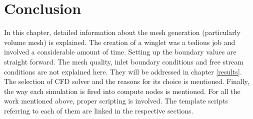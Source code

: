 \section{Conclusion}

In this chapter, detailed information about the mesh generation (particularly volume mesh) is explained. The creation of a winglet was a tedious job and involved a considerable amount of time. Setting up the boundary values are straight forward. The mesh quality, inlet boundary conditions and free stream conditions are not explained here. They will be addressed in chapter \ref{results}. The selection of CFD solver and the reasons for its choice is mentioned. Finally, the way each simulation is fired into compute nodes is mentioned. For all the work mentioned above, proper scripting is involved. The template scripts referring to each of them are linked in the respective sections.   